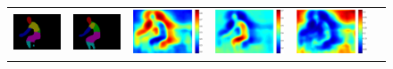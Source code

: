 \begin{figure}
\begin{tabular}{c c c c c c}
   \includegraphics[height=0.1\linewidth]{fig/voc10_part/res_baseline/2010_002927.png} &
   \includegraphics[height=0.1\linewidth]{fig/voc10_part/res_sharenet/2010_002927.png} &
   \includegraphics[height=0.1\linewidth]{fig/voc10_part/att1/2010_002927.pdf} &
   \includegraphics[height=0.1\linewidth]{fig/voc10_part/att2/2010_002927.pdf} &
   \includegraphics[height=0.1\linewidth]{fig/voc10_part/att3/2010_002927.pdf} \\

\end{tabular}
\end{figure}
